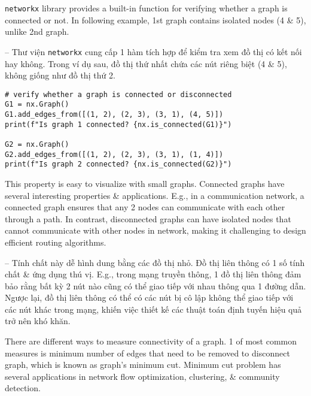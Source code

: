 \documentclass{article}
\begin{document}
\begin{itemize}
\begin{itemize}
        {\tt networkx} library provides a built-in function for verifying whether a graph is connected or not. In following example, 1st graph contains isolated nodes (4 \& 5), unlike 2nd graph.

        -- Thư viện {\tt networkx} cung cấp 1 hàm tích hợp để kiểm tra xem đồ thị có kết nối hay không. Trong ví dụ sau, đồ thị thứ nhất chứa các nút riêng biệt (4 \& 5), không giống như đồ thị thứ 2.
        \begin{verbatim}
# verify whether a graph is connected or disconnected
G1 = nx.Graph()
G1.add_edges_from([(1, 2), (2, 3), (3, 1), (4, 5)])
print(f"Is graph 1 connected? {nx.is_connected(G1)}")

G2 = nx.Graph()
G2.add_edges_from([(1, 2), (2, 3), (3, 1), (1, 4)])
print(f"Is graph 2 connected? {nx.is_connected(G2)}")
        \end{verbatim}
        This property is easy to visualize with small graphs. Connected graphs have several interesting properties \& applications. E.g., in a communication network, a connected graph ensures that any 2 nodes can communicate with each other through a path. In contrast, disconnected graphs can have isolated nodes that cannot communicate with other nodes in network, making it challenging to design efficient routing algorithms.

        -- Tính chất này dễ hình dung bằng các đồ thị nhỏ. Đồ thị liên thông có 1 số tính chất \& ứng dụng thú vị. E.g., trong mạng truyền thông, 1 đồ thị liên thông đảm bảo rằng bất kỳ 2 nút nào cũng có thể giao tiếp với nhau thông qua 1 đường dẫn. Ngược lại, đồ thị liên thông có thể có các nút bị cô lập không thể giao tiếp với các nút khác trong mạng, khiến việc thiết kế các thuật toán định tuyến hiệu quả trở nên khó khăn.

        There are different ways to measure connectivity of a graph. 1 of most common measures is minimum number of edges that need to be removed to disconnect graph, which is known as graph's minimum cut. Minimum cut problem has several applications in network flow optimization, clustering, \& community detection.


\end{itemize}
\end{itemize}
\end{document}
